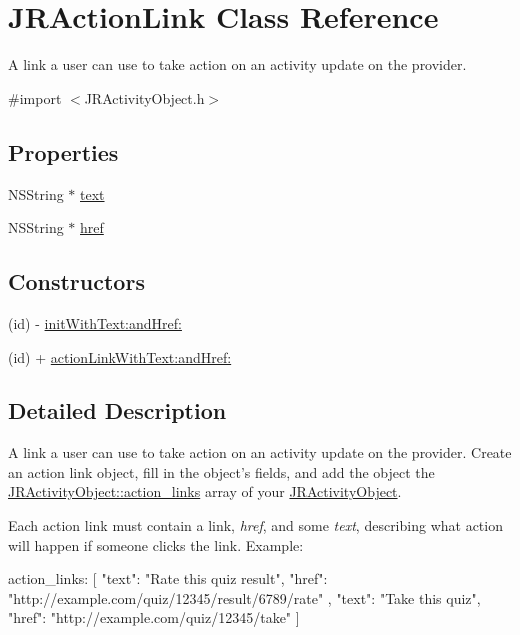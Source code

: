 \hypertarget{interface_j_r_action_link}{
\section{JRActionLink Class Reference}
\label{interface_j_r_action_link}
}


A link a user can use to take action on an activity update on the provider.  




{\ttfamily \#import $<$JRActivityObject.h$>$}

\subsection*{Properties}
\begin{DoxyCompactItemize}
\item 
NSString $\ast$ \hyperlink{interface_j_r_action_link_a062c02005f1c35e651ffbcab51c50b21}{text}
\item 
NSString $\ast$ \hyperlink{interface_j_r_action_link_a45489781731e5965e20fa66af0bd3072}{href}
\end{DoxyCompactItemize}
\subsection*{Constructors}
\label{_amgrp559a25fdb98a7d1fd1c3771ac568d5e9}
 \begin{DoxyCompactItemize}
\item 
(id) -\/ \hyperlink{interface_j_r_action_link_ae1f056641fd3302efbf23d89452553a5}{initWithText:andHref:}
\item 
(id) + \hyperlink{interface_j_r_action_link_a210a41749ddf22e6ce0a7b797fac2f3f}{actionLinkWithText:andHref:}
\end{DoxyCompactItemize}


\subsection{Detailed Description}
A link a user can use to take action on an activity update on the provider. Create an action link object, fill in the object's fields, and add the object the \hyperlink{interface_j_r_activity_object_aa5c629e1c3b8306b2532ab647f7f6ec5}{JRActivityObject::action\_\-links} array of your \hyperlink{interface_j_r_activity_object}{JRActivityObject}.

Each action link must contain a link, {\itshape href\/}, and some {\itshape text\/}, describing what action will happen if someone clicks the link. Example: 
\begin{DoxyCode}
 action_links: 
 [
   {
     "text": "Rate this quiz result",
     "href": "http://example.com/quiz/12345/result/6789/rate"
   },
   {
     "text": "Take this quiz",
     "href": "http://example.com/quiz/12345/take"
   }
 ]
\end{DoxyCode}
 

